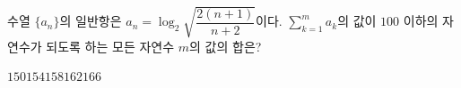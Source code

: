 수열 $\{a_n\}$의 일반항은 $a_n=\log_2\sqrt{\dfrac{2(n+1)}{n+2}}$이다. $\displaystyle\sum_{k=1}^{m}a_k$의 값이 $100$ 이하의 자연수가 되도록 하는 모든 자연수 $m$의 값의 합은?
\begin{choices32}{$150$}{$154$}{$158$}{$162$}{$166$}\end{choices32}
